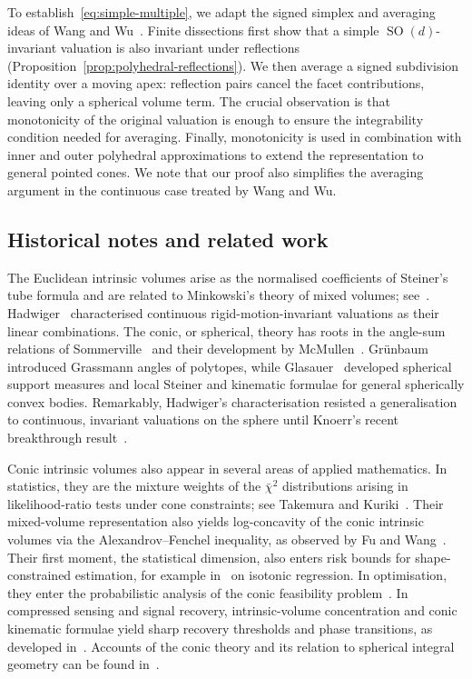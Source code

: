 \documentclass[11pt]{article}
\newcommand{\SOn}[1]{\operatorname{SO}(#1)}
\theoremstyle{plain}
\theoremstyle{definition}
\begin{document}
To establish~\eqref{eq:simple-multiple}, we adapt the signed simplex
and averaging ideas of Wang and Wu~\cite{WangWu:Spherical-Hadwiger}.
Finite dissections first show that a simple $\SOn d$-invariant valuation
is also invariant under reflections (Proposition~\ref{prop:polyhedral-reflections}).
We then average a signed
subdivision identity over a moving apex: reflection pairs cancel the
facet contributions, leaving only a spherical volume term. 
The crucial observation is that monotonicity of
the original valuation is enough to ensure the integrability condition needed for averaging. 
Finally, monotonicity is used in combination with 
inner and outer polyhedral approximations to extend the representation
to general pointed cones. We note that our proof also simplifies the averaging argument
in the continuous case treated by Wang and Wu.

\subsection{Historical notes and related work}\label{sec:historical-notes}

The Euclidean intrinsic volumes arise as the normalised coefficients of Steiner's
tube formula and are related to Minkowski's theory of mixed volumes;
see~\cite{Had57:Vorlesungen,Sch14:Convex-Bodies}.
Hadwiger~\cite{Had57:Vorlesungen} characterised
continuous rigid-motion-invariant valuations as their linear combinations.
The conic, or spherical, theory has roots in the
angle-sum relations of Sommerville~\cite{Som27:Angle-Sums} and their
development by McMullen~\cite{McM75:Nonlinear-Angle-Sum}.
Gr\"unbaum~\cite{Gru68:Grassmann-Angles} introduced Grassmann angles of
polytopes, while Glasauer~\cite{Glasauer95:Thesis} developed spherical
support measures and local Steiner and kinematic formulae for general
spherically convex bodies. Remarkably, Hadwiger's characterisation resisted
a generalisation to continuous, invariant valuations on the sphere until
Knoerr's recent breakthrough result~\cite{Knoerr:Spherical-Hadwiger}.

Conic intrinsic volumes also appear in several areas of applied mathematics.
In statistics, they are the mixture weights of the $\bar\chi^2$
distributions arising in likelihood-ratio tests under cone constraints;
see Takemura and Kuriki~\cite{TK97:Chi-Bar-Squared}.
Their mixed-volume representation also yields log-concavity of the conic
intrinsic volumes via the Alexandrov--Fenchel inequality, as observed by
Fu and Wang~\cite{fu2026logconcavityconicintrinsicvolumes}.
Their first moment, the statistical dimension, also enters risk bounds
for shape-constrained estimation, for example in~\cite{HWCS19:Isotonic-Regression} on isotonic regression.
In optimisation, they enter the probabilistic analysis of the conic
feasibility problem~\cite{Amelunxen:Thesis,AB15:Grassmann-Condition}.
In compressed sensing and signal recovery, intrinsic-volume concentration
and conic kinematic formulae yield sharp recovery thresholds and phase
transitions, as developed in~\cite{ALMT14:Living-Edge}.
Accounts of the conic theory and its relation
to spherical integral geometry can be found
in~\cite{AmelunxenLotz:Intrinsic-Volumes-Cones,Sch22:Convex-Cones}.
\end{document}
